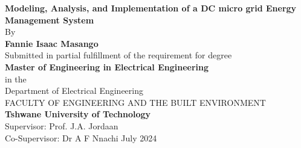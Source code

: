 \begin{titlepage}
	\centering
		\vspace*{1cm}	
			
		{\Large \textbf{Modeling, Analysis, and Implementation of a DC micro grid Energy Management System}	}
		\vspace{0.5cm}	
		\\\relax
		By
		\\\relax	
		\vspace{0.5cm}
		\textbf{Fannie Isaac Masango\\}
		\vspace{2cm}		
		Submitted in partial fulfillment of the requirement for degree\\\relax
		\textbf{Master of Engineering in Electrical Engineering\\\relax}
		\vspace{0.8cm}
		in the\\	
		Department of Electrical Engineering\\\relax
		\vspace{1.5cm}
		FACULTY OF ENGINEERING AND THE BUILT ENVIRONMENT\\\relax
		\textbf{Tshwane University of Technology\\\relax}
		\vspace{1.5cm}
		Supervisor: Prof. J.A. Jordaan\\\relax
		Co-Supervisor: Dr A F Nnachi
		\vspace{2.5cm}
		July 2024
\end{titlepage} 		%